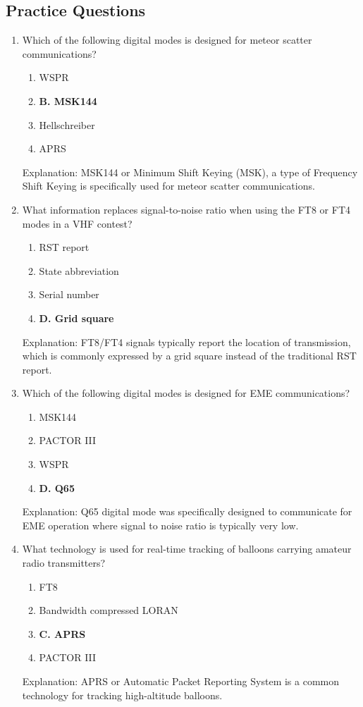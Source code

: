\subsection*{Practice Questions}
\begin{enumerate}
     \item Which of the following digital modes is designed for meteor scatter communications?
    \begin{enumerate}
     \item  WSPR
         \item \textbf{B. MSK144}
          \item  Hellschreiber
         \item  APRS
        \end{enumerate}
    \textcolor{myred}{Explanation:}
        MSK144 or Minimum Shift Keying (MSK), a type of Frequency Shift Keying is specifically used for meteor scatter communications.
     
    \item What information replaces signal-to-noise ratio when using the FT8 or FT4 modes in a VHF contest?
        \begin{enumerate}
           \item  RST report
       \item  State abbreviation
         \item  Serial number
        \item \textbf{D. Grid square}
    \end{enumerate}
       \textcolor{myred}{Explanation:}
     FT8/FT4 signals typically report the location of transmission, which is commonly expressed by a grid square instead of the traditional RST report.
       
      \item Which of the following digital modes is designed for EME communications?
     \begin{enumerate}
    \item  MSK144
         \item  PACTOR III
     \item  WSPR
      \item \textbf{D. Q65}
     \end{enumerate}
      \textcolor{myred}{Explanation:}
   Q65 digital mode was specifically designed to communicate for EME operation where signal to noise ratio is typically very low.
     
     \item What technology is used for real-time tracking of balloons carrying amateur radio transmitters?
      \begin{enumerate}
      \item  FT8
       \item  Bandwidth compressed LORAN
       \item \textbf{C. APRS}
        \item  PACTOR III
        \end{enumerate}
   \textcolor{myred}{Explanation:}
    APRS or Automatic Packet Reporting System is a common technology for tracking high-altitude balloons.


\end{enumerate}

